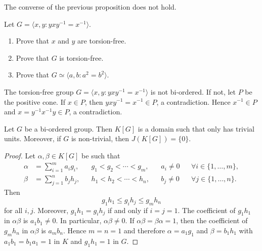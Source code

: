 The converse of the previous proposition does not hold. 

\begin{exercise}
Let $G=\langle x,y:yxy^{-1}=x^{-1}\rangle$. 
\begin{enumerate}
    \item Prove that $x$ and $y$ are torsion-free. 
    \item Prove that $G$ is torsion-free. 
    \item Prove that $G\simeq \langle a,b:a^2=b^2\rangle$.
\end{enumerate}
\end{exercise}



\begin{example}
	The torsion-free group $G=\langle x,y:yxy^{-1}=x^{-1}\rangle$ is not bi-ordered. 
	If not, let $P$ 
	be the positive cone. If $x\in P$, 
	then $yxy^{-1}=x^{-1}\in P$, a contradiction. Hence $x^{-1}\in P$
	and $x=y^{-1}x^{-1}y\in P$, a contradiction.
\end{example}

\begin{theorem}
	\label{thm:BO}
	Let $G$ be a bi-ordered group. Then $K[G]$ is a domain such that
	only has trivial units. Moreover, if $G$ is non-trivial, 
	then $J(K[G])=\{0\}$. 
\end{theorem}

\begin{proof}
	Let $\alpha,\beta\in K[G]$ be such that  
	\begin{align*}
		\alpha&=\sum_{i=1}^m a_ig_i, && g_1<g_2<\cdots<g_m,&& a_i\ne 0 && \forall i\in\{1,\dots,m\},\\
		\beta&=\sum_{j=1}^n b_jh_j, && h_1<h_2<\cdots<h_n, && b_j\ne 0 && \forall j\in\{1,\dots,n\}.
	\end{align*}
	Then 
	\[
		g_1h_1\leq g_ih_j\leq g_mh_n
	\]
	for all $i,j$. Moreover, $g_1h_1=g_ih_j$ if and only if $i=j=1$. The
	coefficient of $g_1h_1$ in $\alpha\beta$ is $a_1b_1\ne 0$. In particular, 
	$\alpha\beta\ne0$. If $\alpha\beta=\beta\alpha=1$, then the coefficient of
	$g_mh_n$ in $\alpha\beta$ is $a_mb_n$. Hence $m=n=1$ and therefore 
	$\alpha=a_1g_1$ and $\beta=b_1h_1$ with $a_1b_1=b_1a_1=1$ in $K$ and $g_1h_1=1$
	in $G$.
\end{proof}

